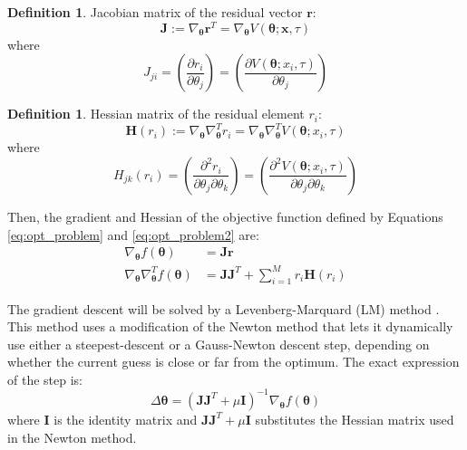 \documentclass[12,twoside]{mammeTFM}
\theoremstyle{definition}
\newtheorem{definition}[thm]{Definition}
\theoremstyle{remark}
\begin{document}
\begin{definition} Jacobian matrix of the residual vector $\boldsymbol{r}$:
\begin{equation}
\boldsymbol{J} := \nabla_{\boldsymbol{\theta}} \boldsymbol{r}^T = \nabla_{\boldsymbol{\theta}} V(\boldsymbol{\theta}; \boldsymbol{x}, \tau)
\end{equation}
where
\begin{equation}
J_{ji} = \left(\dfrac{\partial r_i}{\partial \theta_j} \right) = \left(\dfrac{\partial V(\boldsymbol{\theta}; x_i, \tau)}{\partial \theta_j} \right)
\end{equation}
\end{definition}

\begin{definition} Hessian matrix of the residual element $r_i$:
\begin{equation}
\boldsymbol{H}(r_i) := \nabla_{\boldsymbol{\theta}} \nabla_{\boldsymbol{\theta}}^{T} r_i = \nabla_{\boldsymbol{\theta}} \nabla_{\boldsymbol{\theta}}^{T} V(\boldsymbol{\theta}; x_i, \tau)
\end{equation}
where
\begin{equation}
H_{jk}(r_i) = \left(\dfrac{\partial^2 r_i}{\partial \theta_j \partial \theta_k} \right) = \left(\dfrac{\partial^2 V(\boldsymbol{\theta}; x_i, \tau)}{\partial \theta_j\partial \theta_k} \right)
\end{equation}
\end{definition}

Then, the gradient and Hessian of the objective function defined by Equations \ref{eq:opt_problem} and \ref{eq:opt_problem2} are:
\begin{align}
\nabla_{\boldsymbol{\theta}}f(\boldsymbol{\theta}) &= \boldsymbol{J}\boldsymbol{r} \\
\nabla_{\boldsymbol{\theta}}\nabla_{\boldsymbol{\theta}}^{T} f(\boldsymbol{\theta}) &= \boldsymbol{J}\boldsymbol{J}^{T} + \sum_{i = 1}^{M} r_i \boldsymbol{H}(r_i)
\end{align}

The gradient descent will be solved by a Levenberg-Marquard (LM) method \cite{mor78}. This method uses a modification of the Newton method that lets it dynamically use either a steepest-descent or a Gauss-Newton descent step, depending on whether the current guess is close or far from the optimum. The exact expression of the step is:
\begin{equation}
\Delta \boldsymbol{\theta} = (\boldsymbol{J}\boldsymbol{J}^{T} + \mu \boldsymbol{I})^{-1} \nabla_{\boldsymbol{\theta}} f(\boldsymbol{\theta})
\end{equation}
where $\boldsymbol{I}$ is the identity matrix and $\boldsymbol{J}\boldsymbol{J}^{T} + \mu \boldsymbol{I}$ substitutes the Hessian matrix used in the Newton method.
\end{document}
